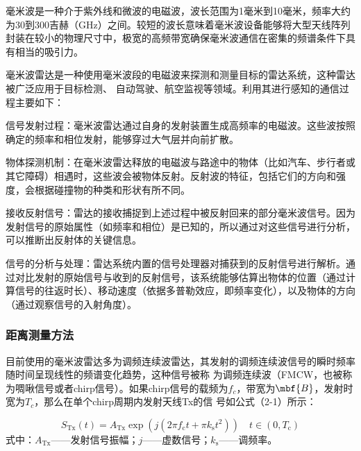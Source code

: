 \xiaosi



毫米波是一种介于紫外线和微波的电磁波，波长范围为1毫米到10毫米，频率大约为30到300吉赫（GHz）之间。较短的波长意味着毫米波设备能够将大型天线阵列封装在较小的物理尺寸中，极宽的高频带宽确保毫米波通信在密集的频谱条件下具有相当的吸引力\cite{wang2018millimeter}。


毫米波雷达是一种使用毫米波段的电磁波来探测和测量目标的雷达系统，这种雷达被广泛应用于目标检测\cite{liu2023smurf}、
自动驾驶\cite{roos2019radar}、航空监视\cite{morris2021detection}等领域。利用其进行感知的通信过程主要如下：

信号发射过程：毫米波雷达通过自身的发射装置生成高频率的电磁波。这些波按照确定的频率和相位发射，能够穿过大气层并向前扩散。

物体探测机制：在毫米波雷达释放的电磁波与路途中的物体（比如汽车、步行者或其它障碍）相遇时，这些波会被物体反射。反射波的特征，包括它们的方向和强度，会根据碰撞物的种类和形状有所不同。

接收反射信号：雷达的接收捕捉到上述过程中被反射回来的部分毫米波信号。因为发射信号的原始属性（如频率和相位）是已知的，所以通过对这些信号进行分析，可以推断出反射体的关键信息。

信号的分析与处理：雷达系统内置的信号处理器对捕获到的反射信号进行解析。通过对比发射的原始信号与收到的反射信号，该系统能够估算出物体的位置（通过计算信号的往返时长）、移动速度（依据多普勒效应，即频率变化），以及物体的方向（通过观察信号的入射角度）。


\subsubsection{距离测量方法}

目前使用的毫米波雷达多为调频连续波雷达，其发射的调频连续波信号的瞬时频率随时间呈现线性的频谱变化趋势，这种信号被称
为调频连续波（FMCW，也被称为啁啾信号或者chirp信号）。如果chirp信号的载频为$f_c$，带宽为$\mbf{B}$，发射时宽为$T_c$，那么在单个chirp周期内发射天线Tx的信
号如公式（2-1）所示：

\begin{equation}
    S_\mathrm{Tx}\left(t\right)=A_\mathrm{Tx}\exp\left(j\left(2\pi f_\mathrm{c}t+\pi k_\mathrm{s}t^2\right)\right)\quad t\in\left(0,T_\mathrm{c}\right)
\end{equation}
式中：$A_\mathrm{Tx}$——发射信号振幅；$j$——虚数信号；$k_\mathrm{s}$——调频率。

